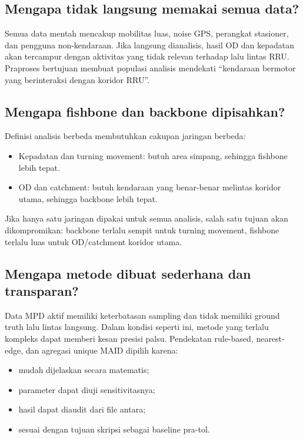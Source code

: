 \documentclass[11pt,a4paper]{article}
\begin{document}
\subsection{Mengapa tidak langsung memakai semua data?}
Semua data mentah mencakup mobilitas luas, noise GPS, perangkat stasioner, dan pengguna non-kendaraan. Jika langsung dianalisis, hasil OD dan kepadatan akan tercampur dengan aktivitas yang tidak relevan terhadap lalu lintas RRU. Praproses bertujuan membuat populasi analisis mendekati ``kendaraan bermotor yang berinteraksi dengan koridor RRU''.

\subsection{Mengapa fishbone dan backbone dipisahkan?}
Definisi analisis berbeda membutuhkan cakupan jaringan berbeda:
\begin{itemize}
    \item Kepadatan dan turning movement: butuh area simpang, sehingga fishbone lebih tepat.
    \item OD dan catchment: butuh kendaraan yang benar-benar melintas koridor utama, sehingga backbone lebih tepat.
\end{itemize}
Jika hanya satu jaringan dipakai untuk semua analisis, salah satu tujuan akan dikompromikan: backbone terlalu sempit untuk turning movement, fishbone terlalu luas untuk OD/catchment koridor utama.

\subsection{Mengapa metode dibuat sederhana dan transparan?}
Data MPD aktif memiliki keterbatasan sampling dan tidak memiliki ground truth lalu lintas langsung. Dalam kondisi seperti ini, metode yang terlalu kompleks dapat memberi kesan presisi palsu. Pendekatan rule-based, nearest-edge, dan agregasi unique MAID dipilih karena:
\begin{itemize}
    \item mudah dijelaskan secara matematis;
    \item parameter dapat diuji sensitivitasnya;
    \item hasil dapat diaudit dari file antara;
    \item sesuai dengan tujuan skripsi sebagai baseline pra-tol.
\end{itemize}
\end{document}
